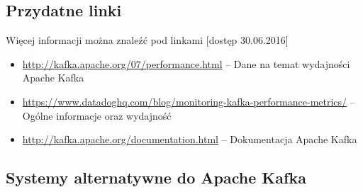 \documentclass[a4paper,12pt]{article}
\begin{document}
\subsection{Przydatne linki}
Więcej informacji można znaleźć pod linkami [dostęp 30.06.2016]
\begin{itemize}
\item \url{http://kafka.apache.org/07/performance.html} -- Dane na temat wydajności Apache Kafka
\item \url{https://www.datadoghq.com/blog/monitoring-kafka-performance-metrics/} -- Ogólne informacje oraz wydajność
\item \url{http://kafka.apache.org/documentation.html} -- Dokumentacja Apache Kafka
\end{itemize}
\subsection{Systemy alternatywne do Apache Kafka}
\end{document}
